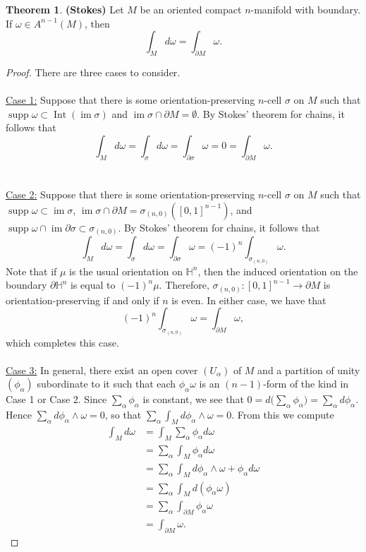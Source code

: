 \documentclass[10pt,letterpaper,cm]{nupset}
\theoremstyle{definition}
\newtheorem{theorem}{Theorem}
\renewcommand{\H}{\mathbb H}
\newcommand{\1}{\mathbf{1}}
\newcommand{\0}{\vec 0}
\DeclareMathOperator{\im}{im}
\DeclareMathOperator{\Int}{Int}
\DeclareMathOperator{\supp}{supp}
\begin{document}
\begin{theorem}{\textbf{(Stokes)}}
Let $M$ be an oriented compact $n$-manifold with boundary. If $\omega \in A^{n-1}(M)$, then $$ \int_M d\omega = \int_{\partial{M}} \omega  .$$
\end{theorem}
\begin{proof} There are three cases to consider.
\\ \\
\underline{Case 1:} Suppose that there is some orientation-preserving $n$-cell $\sigma$ on $M$ such that $\supp \omega \subset \Int(\im \sigma)$ and $\im \sigma \cap \partial{M} =\emptyset$. By Stokes' theorem for chains, it follows that $$\int_M d\omega  = \int_{\sigma} d\omega = \int_{\partial{\sigma}} \omega = 0 = \int_{\partial{M}} \omega    .$$
\\ \\
\underline{Case 2:} Suppose that there is some orientation-preserving $n$-cell $\sigma$ on $M$ such that $\supp \omega \subset  \im \sigma$, $\im \sigma \cap \partial{M} =\sigma_{(n,0)}([0,1]^{n-1})$, and $\supp \omega \cap \im \partial{\sigma} \subset \sigma_{(n,0)}$. By Stokes' theorem for chains, it follows that $$\int_M d\omega  = \int_{\sigma} d\omega = \int_{\partial{\sigma}} \omega = (-1)^n \int_{\sigma_{(n,0)}} \omega .$$ Note that if $\mu$ is the usual orientation on $\H^n$, then the induced orientation on the boundary $\partial{\H^n}$ is equal to $(-1)^n \mu$. Therefore, $\sigma_{(n,0)} : [0,1]^{n-1}\to \partial{M}$ is orientation-preserving  if and only if $n$ is even. In either case, we have that $$(-1)^n \int_{\sigma_{(n,0)}} \omega = \int_{\partial{M}} \omega  ,$$ which completes this case.
\\ \\
\underline{Case 3:} In general, there exist an open cover $(U_{\alpha})$ of $M$ and a partition of unity $(\phi_{\alpha})$ subordinate to it such that each $\phi_{\alpha}\omega$ is an $(n-1)$-form of the kind in Case 1 or Case 2. Since $\sum_{\alpha} \phi_{\alpha}$ is constant, we see that $0 = d\big (\sum_{\alpha} \phi_{\alpha} \big ) = \sum_{\alpha} d \phi_{\alpha}$. Hence $ \sum_{\alpha} d \phi_{\alpha} \wedge \omega =0$, so that $\sum_{\alpha} \int_M d\phi_{\alpha} \wedge \omega =0$. From this we compute
\begin{align*}
 \int_M d\omega & = \int_M \sum_{\alpha} \phi_{\alpha} d\omega 
 \\ & = \sum_{\alpha}\int_M \phi_{\alpha} d\omega
\\ & =  \sum_{\alpha}\int_M d\phi_{\alpha} \wedge \omega + \phi_{\alpha} d\omega 
\\ & =  \sum_{\alpha}\int_M d(\phi_{\alpha} \omega)
\\ & = \sum_{\alpha} \int_{\partial{M}} \phi_{\alpha} \omega 
\\ & =  \int_{\partial{M}} \omega .
\end{align*}
\end{proof}
\end{document}
